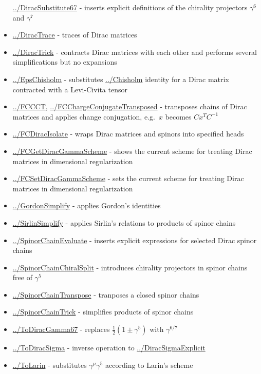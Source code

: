 \documentclass[../FeynCalcManual.tex]{subfiles}
\begin{document}
\begin{itemize}
  \hyperlink{../diracsubstitute67}{../DiracSubstitute67} - inserts
  explicit definitions of the chirality projectors \(\gamma^6\) and
  \(\gamma^7\)
\item
  \hyperlink{../diractrace}{../DiracTrace} - traces of Dirac matrices
\item
  \hyperlink{../diractrick}{../DiracTrick} - contracts Dirac matrices
  with each other and performs several simplifications but no expansions
\item
  \hyperlink{../epschisholm}{../EpsChisholm} - substitutes
  \hyperlink{../chisholm}{../Chisholm} identity for a Dirac matrix
  contracted with a Levi-Civita tensor
\item
  \hyperlink{../fccct}{../FCCCT},
  \hyperlink{../fcchargeconjugatetransposed}{../FCChargeConjugateTransposed}
  - transposes chains of Dirac matrices and applies change conjugation,
  e.g.~\(x\) becomes \(C x^T C^{-1}\)
\item
  \hyperlink{../fcdiracisolate}{../FCDiracIsolate} - wraps Dirac
  matrices and spinors into specified heads
\item
  \hyperlink{../fcgetdiracgammascheme}{../FCGetDiracGammaScheme} - shows
  the current scheme for treating Dirac matrices in dimensional
  regularization
\item
  \hyperlink{../fcsetdiracgammascheme}{../FCSetDiracGammaScheme} - sets
  the current scheme for treating Dirac matrices in dimensional
  regularization
\item
  \hyperlink{../gordonsimplify}{../GordonSimplify} - applies Gordon's
  identities
\item
  \hyperlink{../sirlinsimplify}{../SirlinSimplify} - applies Sirlin's
  relations to products of spinor chains
\item
  \hyperlink{../spinorchainevaluate}{../SpinorChainEvaluate} - inserts
  explicit expressions for selected Dirac spinor chains
\item
  \hyperlink{../spinorchainchiralsplit}{../SpinorChainChiralSplit} -
  introduces chirality projectors in spinor chains free of \(\gamma^5\)
\item
  \hyperlink{../spinorchaintranspose}{../SpinorChainTranspose} -
  tranposes a closed spinor chains
\item
  \hyperlink{../spinorchaintrick}{../SpinorChainTrick} - simplifies
  products of spinor chains
\item
  \hyperlink{../todiracgamma67}{../ToDiracGamma67} - replaces
  \(\frac{1}{2}(1 \pm \gamma^5)\) with \(\gamma^{6/7}\)
\item
  \hyperlink{../todiracsigma}{../ToDiracSigma} - inverse operation to
  \hyperlink{../diracsigmaexplicit}{../DiracSigmaExplicit}
\item
  \hyperlink{../tolarin}{../ToLarin} - substitutes
  \(\gamma^\mu \gamma^5\) according to Larin's scheme
\end{itemize}
\end{document}

